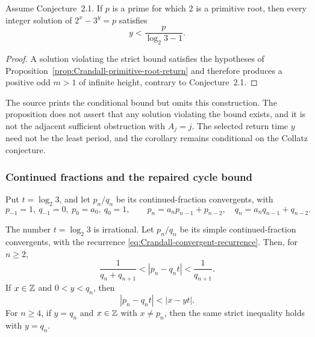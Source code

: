 \begin{corollary}
\label{cor:Crandall-primitive-root-bound}
Assume Conjecture~2.1.  If $p$ is a prime for which $2$ is a primitive root,
then every integer solution of $2^x-3^y=p$ satisfies
\[
 y<\frac{p}{\log_2 3-1}.
\]
\end{corollary}

\begin{proof}
A solution violating the strict bound satisfies the hypotheses of
Proposition~\ref{prop:Crandall-primitive-root-return} and therefore produces
a positive odd $m>1$ of infinite height, contrary to Conjecture~2.1.
\end{proof}

\begin{nonclaim}
\label{nonclaim:Crandall-primitive-root}
The source prints the conditional bound but omits this construction.  The
proposition does not assert that any solution violating the bound exists, and
it is not the adjacent sufficient obstruction with $A_j=j$.  The selected
return time $y$ need not be the least period, and the corollary remains
conditional on the Collatz conjecture.
\end{nonclaim}

\subsubsection{Continued fractions and the repaired cycle bound}

Put $t=\log_2 3$, and let $p_n/q_n$ be its continued-fraction convergents,
with
\begin{equation}
\label{eq:Crandall-convergent-recurrence}
 p_{-1}=1,\ q_{-1}=0,\ p_0=a_0,\ q_0=1,
 \qquad
 p_n=a_np_{n-1}+p_{n-2},\quad
 q_n=a_nq_{n-1}+q_{n-2}.
\end{equation}

\begin{lemma}
\label{lem:Crandall-CF-dependency}
The number $t=\log_2 3$ is irrational.  Let $p_n/q_n$ be its simple
continued-fraction convergents, with the recurrence
\eqref{eq:Crandall-convergent-recurrence}.  Then, for $n\geq2$,
\begin{equation}
\label{eq:Crandall-CF-error-bounds}
 \frac{1}{q_n+q_{n+1}}
 < |p_n-q_nt|
 < \frac{1}{q_{n+1}}.
\end{equation}
If $x\in\mathbb{Z}$ and $0<y<q_n$, then
\begin{equation}
\label{eq:Crandall-CF-best-approximation}
 |p_n-q_nt|<|x-yt|.
\end{equation}
For $n\geq4$, if $y=q_n$ and $x\in\mathbb{Z}$ with $x\ne p_n$, then the same
strict inequality holds with $y=q_n$.
\end{lemma}

